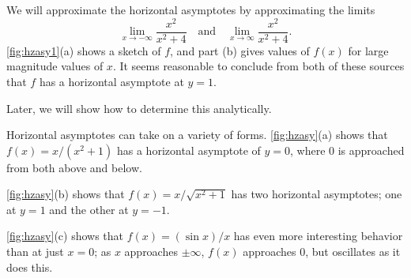 {We will approximate the horizontal asymptotes by approximating the limits
\[
\lim_{x\to-\infty} \frac{x^2}{x^2+4}\quad \text{and}\quad \lim_{x\to\infty} \frac{x^2}{x^2+4}.
\]
\autoref{fig:hzasy1}(a) shows a sketch of $f$, and part (b) gives values of $f(x)$ for large magnitude values of $x$. It seems reasonable to conclude from both of these sources that $f$ has a horizontal asymptote at $y=1$.

Later, we will show how to determine this analytically.}

Horizontal asymptotes can take on a variety of forms. \autoref{fig:hzasy}(a) shows that $f(x) = x/(x^2+1)$ has a horizontal asymptote of $y=0$, where 0 is approached from both above and below.

\autoref{fig:hzasy}(b) shows that $f(x) =x/\sqrt{x^2+1}$ has two horizontal asymptotes; one at $y=1$ and the other at $y=-1$.

\autoref{fig:hzasy}(c) shows that $f(x) = (\sin x)/x$ has even more interesting behavior than at just $x=0$; as $x$ approaches $\pm\infty$, $f(x)$ approaches 0, but oscillates as it does this.

